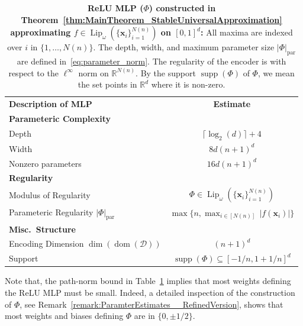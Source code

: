 \documentclass{article}
\numberwithin{equation}{section}
\theoremstyle{definition}
\begin{document}
\begin{table}[htp!]%
    \centering
    \begin{tabular}{@{}lc@{}}
    \toprule
    \textbf{Description of MLP} & \textbf{Estimate}\\
    \arrayrulecolor{lightgray}\midrule 
    \textbf{Parameteric Complexity} & \\
    Depth & $\lceil \log_2(d)\rceil +4$
    \\
    Width & $8d(n+1)^d$
    \\
    Nonzero parameters & $16d(n+1)^d$
    \\
    \arrayrulecolor{lightgray}\midrule 
    \arrayrulecolor{lightgray}\midrule 
    \textbf{Regularity} & 
    \\
    Modulus of Regularity %
    & $\Phi \in \operatorname{Lip}_{\omega}(\{\mathbf{x}_i\}_{i=1}^{N(n)})$
    \\
    Parameteric Regularity $|\Phi|_{\operatorname{par}}$ & $\max\{n,\max_{i\in [N(n)]}\,|f(\mathbf{x}_i)|\}$
    \\
    \arrayrulecolor{lightgray}\midrule 
    \arrayrulecolor{lightgray}\midrule 
    \textbf{Misc.\ Structure} & \\
    Encoding Dimension $\dim(\operatorname{dom}(\mathcal{D}))$ & $(n+1)^d$\\
    Support & $\operatorname{supp}(\Phi) \subseteq [-1/n,1+1/n]^d$
    \\
    \bottomrule
    \end{tabular}
    \caption{\textbf{ReLU MLP ($\Phi$) constructed in Theorem~\ref{thm:MainTheorem_StableUniversalApproximation} approximating $f\in \operatorname{Lip}_{\omega}(\{\mathbf{x}_i\}_{i=1}^{N(n)})$ on $[0,1]^d$:} All maxima are indexed over $i$ in $\{1,\dots,N(n)\}$.
    The depth, width, and maximum parameter size $|\Phi|_{\operatorname{par}}$ are defined in~\eqref{eq:parameter_norm}.
    The regularity of the encoder is with respect to the $\ell^{\infty}$ norm on $\mathbb{R}^{N(n)}$.
    By the support $\operatorname{supp}(\Phi)$ of $\Phi$, we mean the set points in $\mathbb{R}^d$ where it is non-zero.
    }
\label{tab:MLP_Description}
\end{table}
Note that, the path-norm bound in Table~\ref{tab:MLP_Description} implies that most weights defining the ReLU MLP must be small.  Indeed, a detailed inspection of the construction of $\Phi$, see Remark~\ref{remark:ParamterEstimates__RefinedVersion}, shows that most weights and biases defining $\Phi$ are in $\{0,\pm 1/2\}$.  
\end{document}
